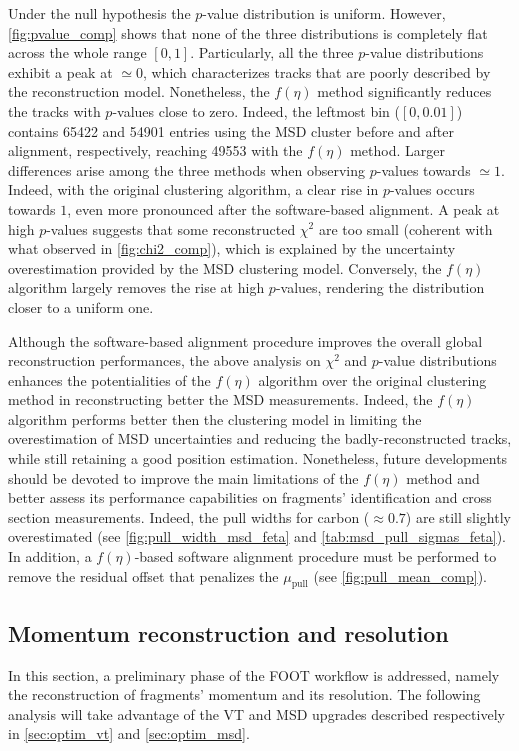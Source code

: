 Under the null hypothesis the $p$-value distribution is uniform. However, \autoref{fig:pvalue_comp} shows that none of the three distributions is completely flat across the whole range $\left[0,1\right]$. Particularly, all the three $p$-value distributions exhibit a peak at $\simeq0$, which characterizes tracks that are poorly described by the reconstruction model. Nonetheless, the $f(\eta)$ method significantly reduces the tracks with $p$-values close to zero. Indeed, the leftmost bin ($\left[0,0.01\right]$) contains \num{65422} and \num{54901} entries using the MSD cluster before and after alignment, respectively, reaching \num{49553} with the $f(\eta)$ method. Larger differences arise among the three methods when observing $p$-values towards $\simeq1$. Indeed, with the original clustering algorithm, a clear rise in $p$-values occurs towards $1$, even more pronounced after the software-based alignment. A peak at high $p$-values suggests that some reconstructed $\chi^2$ are too small (coherent with what observed in \autoref{fig:chi2_comp}), which is explained by the uncertainty overestimation provided by the MSD clustering model. Conversely, the $f(\eta)$ algorithm largely removes the rise at high $p$-values, rendering the distribution closer to a uniform one.

Although the software-based alignment procedure improves the overall global reconstruction performances, the above analysis on $\chi^2$ and $p$-value distributions enhances the potentialities of the $f(\eta)$ algorithm over the original clustering method in reconstructing better the MSD measurements. Indeed, the $f(\eta)$ algorithm performs better then the clustering model in limiting the overestimation of MSD uncertainties and reducing the badly-reconstructed tracks, while still retaining a good position estimation. Nonetheless, future developments should be devoted to improve the main limitations of the $f(\eta)$ method and better assess its performance capabilities on fragments' identification and cross section measurements. Indeed, the pull widths for carbon ($\approx0.7$) are still slightly overestimated (see \autoref{fig:pull_width_msd_feta} and \autoref{tab:msd_pull_sigmas_feta}). In addition, a $f(\eta)$-based software alignment procedure must be performed to remove the residual offset that penalizes the $\mu_{\text{pull}}$ (see \autoref{fig:pull_mean_comp}).
\subsection{Momentum reconstruction and resolution}\label{ssec:momentum_reco}
In this section, a preliminary phase of the FOOT workflow is addressed, namely the reconstruction of fragments' momentum and its resolution. The following analysis will take advantage of the VT and MSD upgrades described respectively in \autoref{sec:optim_vt} and \autoref{sec:optim_msd}.

